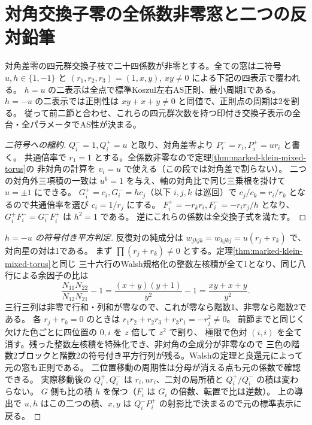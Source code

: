 \section{対角交換子零の全係数非零窓と二つの反対鉛筆}
\label{sec:marked-klein-zero-bracket-torus}
\begin{theorem}\label{thm:marked-klein-zero-bracket-torus}
対角差零の四元群交換子枝で二十四係数が非零とする。全ての窓は二符号 $u,h\in\{1,-1\}$ と
$(r_1,r_2,r_3)=(1,x,y)$, $xy\ne0$ による下記の四表示で覆われる。
$h=u$ の二表示は全点で標準Koszul左右AS正則、最小周期1である。
$h=-u$ の二表示では正則性は $xy+x+y\ne0$ と同値で、正則点の周期は2を割る。
従って前二節と合わせ、これらの四元群次数を持つ印付き交換子表示の全台・全パラメータでAS性が決まる。
\end{theorem}
\begin{proof}[二符号への縮約]
$Q_i^- =1,Q_i^+=u$ と取り、対角差零より $P_i^-=r_i,P_i^+=ur_i$ と書く。
共通倍率で $r_1=1$ とする。全係数非零なので定理\ref{thm:marked-klein-mixed-torus}の
非対角の計算を $v_i=u$ で使える（この段では対角差で割らない）。
二つの対角外三項積の一致は $u^6=1$ を与え、軸の対角比で同じ三乗根を掛けて $u=\pm1$ にできる。
$G_i^+=c_i,G_i^-=hc_j$（以下 $i,j,k$ は巡回）で
$c_j/c_k=r_i/r_k$ となるので共通倍率を選び $c_i=1/r_j$ にする。
$F_i^+=-r_kr_i,F_i^-=-r_ir_j/h$ となり、$G_i^+F_i^-=G_i^-F_i^+$ は $h^2=1$ である。
逆にこれらの係数は全交換子式を満たす。
\end{proof}

\begin{proof}[$h=-u$ の符号付き平方判定]
反復対の純成分は $w_{jkjk}=w_{kjkj}=u(r_j+r_k)$ で、対向星の対は1である。
まず $\prod(r_j+r_k)\ne0$ とする。定理\ref{thm:marked-klein-mixed-torus}と同じ
三十六行のWalsh規格化の整数左核積が全て1となり、同じ八行による余因子の比は
\[
       \frac{N_{11}N_{22}}{N_{12}N_{21}}-1
            =\frac{(x+y)(y+1)}{y^2}-1
            =\frac{xy+x+y}{y^2}.
\]
三行三列は非零で行和・列和が零なので、これが零なら階数1、非零なら階数2である。
各 $r_j+r_k=0$ のときは $r_1r_2+r_2r_3+r_3r_1=-r_j^2\ne0$。
前節までと同じく欠けた色ごとに四位置の $0,i$ を $z$ 倍して $z^2$ で割り、
極限で色対 $(i,i)$ を全て消す。残った整数左核積を特殊化でき、非対角の全成分が非零なので
三色の階数2ブロックと階数2の符号付き平方行列が残る。Walshの定理と良還元によって元の窓も正則である。
二位置移動の周期性は分母が消える点も元の係数で確認できる。
実際移動後の $Q_i^+,Q_i^-$ は $r_i,ur_i$、二対の局所積と $Q_i^+/Q_i^-$ の積は変わらない。
$G$ 側も比の積 $h$ を保つ（$F_i$ は $G_i$ の倍数、転置で比は逆数）。
上の導出で $u,h$ はこの二つの積、$x,y$ は $Q_i^-P_i^+$ の射影比で決まるので元の標準表示に戻る。
\end{proof}

